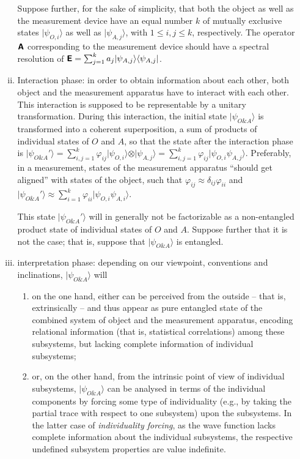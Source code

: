 \begin{enumerate}[(I)]
\begin{enumerate}[(i)]
Suppose further, for the sake of simplicity, that both the object as well as the measurement device
have an equal number $k$ of mutually exclusive states
$\vert \psi_{O,i}\rangle$
as well as
$\vert \psi_{A,j}\rangle$,
with $1 \le i,j \le k$, respectively.
The operator $\textsf{\textbf{A}}$ corresponding to the measurement device
should have a spectral resolution of $\textsf{\textbf{E}} = \sum_{j=1}^k a_j \vert \psi_{A,j}\rangle \langle   \psi_{A,j} \vert$.


\item
Interaction phase:
in order to obtain information about each other, both object and the measurement apparatus have to interact with each other.
This interaction is supposed to be representable by a unitary transformation.
During this interaction, the initial state
$\vert \psi_{O\& A} \rangle$ is transformed into a coherent superposition, a sum of products of individual states of $O$ and $A$, so that
the state after the interaction phase is
$\vert \psi_{O\& A}' \rangle =  \sum_{i,j=1}^k \varphi_{ij} \vert \psi_{O,i}\rangle \otimes \vert \psi_{A,j}\rangle =
\sum_{i,j=1}^k \varphi_{ij} \vert \psi_{O,i} \psi_{A,j}\rangle$.
Preferably, in a measurement, states of the measurement apparatus ``should get aligned'' with states of the object, such that
$\varphi_{ij} \approx \delta_{ij}\varphi_{ii}$ and
$\vert \psi_{O\& A}' \rangle \approx
\sum_{i=1}^k \varphi_{ii} \vert \psi_{O,i} \psi_{A,i}\rangle$.

This state $\vert \psi_{O\& A}' \rangle$ will in generally not be factorizable
as a non-entangled product state of individual states of $O$ and $A$.
Suppose further that it is not the case; that is, suppose that  $\vert \psi_{O\& A} \rangle$ is entangled.

\item interpretation phase:
depending on our viewpoint, conventions and inclinations,
$\vert \psi_{O\& A} \rangle$
will
\begin{enumerate}
\item
on the one hand, either can be perceived
from the outside -- that is, extrinsically -- and thus appear as pure entangled state of the combined system of object and the measurement apparatus,
encoding relational information (that is, statistical correlations) among these subsystems, but
lacking complete information of individual subsystems;
\item
or, on the other hand,
from the intrinsic point of view of individual subsystems,
$\vert \psi_{O\& A} \rangle$ can be analysed in terms of the individual components by forcing some type of
individuality (e.g., by taking the partial trace with respect to one subsystem) upon the subsystems.
In the latter case of {\em individuality forcing},
as the wave function lacks complete information about the individual subsystems,
the respective undefined subsystem properties are value indefinite.


\end{enumerate}
\end{enumerate}
\end{enumerate}
